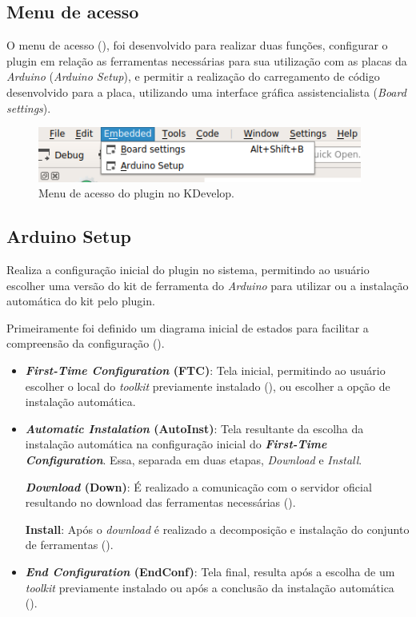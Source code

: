 \subsection{Menu de acesso}

O menu de acesso (), foi desenvolvido para realizar duas funções, configurar o plugin em relação as ferramentas necessárias para sua utilização com as placas da \textit{Arduino} (\textit{Arduino Setup}), e permitir a realização do carregamento de código desenvolvido para a placa, utilizando uma interface gráfica assistencialista (\textit{Board settings}).

\begin{figure}[!htb]
  \centering
  \includegraphics[width=0.95\textwidth]{figuras/kdevelopMenu.png}
  \caption[Menu do plugin no KDevelop]{Menu de acesso do plugin no KDevelop.}
  \label{fig:kdevelopMenu}
\end{figure}

\subsection{Arduino Setup}

Realiza a configuração inicial do plugin no sistema, permitindo ao usuário escolher uma versão do kit de ferramenta do \textit{Arduino} para utilizar ou a instalação automática do kit pelo plugin.

Primeiramente foi definido um diagrama inicial de estados para facilitar a compreensão da configuração ().

\begin{itemize}
\item \textbf{\textit{First-Time Configuration} (FTC)}: Tela inicial, permitindo ao usuário escolher o local do \textit{toolkit} previamente instalado (), ou escolher a opção de instalação automática. 

\item \textbf{\textit{Automatic Instalation} (AutoInst)}: Tela resultante da escolha da instalação automática na configuração inicial do \textbf{\textit{First-Time Configuration}}. Essa, separada em duas etapas, \textit{Download} e \textit{Install}.

\subitem \textbf{\textit{Download} (Down)}: É realizado a comunicação com o servidor oficial resultando no download das ferramentas necessárias ().

\subitem \textbf{Install}: Após o \textit{download} é realizado a decomposição e instalação do conjunto de ferramentas ().

\item \textbf{\textit{End Configuration} (EndConf)}: Tela final, resulta após a escolha de um \textit{toolkit} previamente instalado ou após a conclusão da instalação automática ().
\end{itemize}

